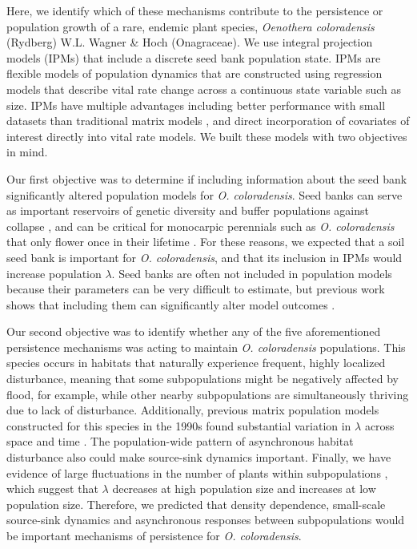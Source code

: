 \documentclass[12pt, letterpaper]{article}
\begin{document}
Here, we identify which of these mechanisms contribute to the persistence or population growth of a rare, endemic plant species, \textit{Oenothera coloradensis} (Rydberg) W.L. Wagner \& Hoch (Onagraceae). We use integral projection models (IPMs) \cite{Easterling2000} that include a discrete seed bank population state. IPMs are flexible models of population dynamics that are constructed using regression models that describe vital rate change across a continuous state variable such as size. IPMs have multiple advantages including better performance with small datasets than traditional matrix models \cite{Ramula2009IntegralHerbs}, and direct incorporation of covariates of interest directly into vital rate models. We built these models with two objectives in mind.

Our first objective was to determine if including information about the seed bank significantly altered population models for \textit{O. coloradensis}. Seed banks can serve as important reservoirs of genetic diversity and buffer populations against collapse \cite{Vitalis2004WhenPerenniality}, and can be critical for monocarpic perennials such as \textit{O. coloradensis} that only flower once in their lifetime \cite{Rees2006}. For these reasons, we expected that a soil seed bank is important for \textit{O. coloradensis}, and that its inclusion in IPMs would increase population $\lambda$. Seed banks are often not included in population models because their parameters can be very difficult to estimate, but previous work shows that including them can significantly alter model outcomes \cite{Paniw2017, Nguyen2019ConsequencesModels}.

Our second objective was to identify whether any of the five aforementioned persistence mechanisms was acting to maintain \textit{O. coloradensis} populations. This species occurs in habitats that naturally experience frequent, highly localized disturbance, meaning that some subpopulations might be negatively affected by flood, for example, while other nearby subpopulations are simultaneously thriving due to lack of disturbance. Additionally, previous matrix population models constructed for this species in the 1990s found substantial variation in $\lambda$ across space and time \cite{Floyd1998}. The population-wide pattern of asynchronous habitat disturbance also could make source-sink dynamics important. Finally, we have evidence of large fluctuations in the number of plants within subpopulations \cite{Heidel202133-YearWyoming}, which suggest that $\lambda$ decreases at high population size and increases at low population size. Therefore, we predicted that density dependence, small-scale source-sink dynamics and asynchronous responses between subpopulations would be important mechanisms of persistence for \textit{O. coloradensis}.  
\end{document}
